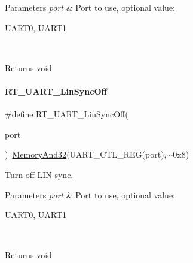 \begin{DoxyParams}{Parameters}
{\em port} & Port to use, optional value\+:
\begin{DoxyCode}
\mbox{\hyperlink{a00098_a0508661f121639ffdee7de2353a0def2}{UART0}}, \mbox{\hyperlink{a00098_a8d69bf04d07af4fbbab5a8bd291f65ff}{UART1}}
\end{DoxyCode}
 \\
\hline
\end{DoxyParams}
\begin{DoxyReturn}{Returns}
void 
\end{DoxyReturn}
\mbox{\label{a00098_aea01869278bc3c4e332af854c4e660be}} 
\paragraph{\texorpdfstring{R\+T\+\_\+\+U\+A\+R\+T\+\_\+\+Lin\+Sync\+Off}{RT\_UART\_LinSyncOff}}
{\footnotesize\ttfamily \#define R\+T\+\_\+\+U\+A\+R\+T\+\_\+\+Lin\+Sync\+Off(\begin{DoxyParamCaption}\item[{}]{port }\end{DoxyParamCaption})~\mbox{\hyperlink{a00026_ad87cedffcaadc51db22594fce55173d4}{Memory\+And32}}(U\+A\+R\+T\+\_\+\+C\+T\+L\+\_\+\+R\+EG(port),$\sim$0x8)}



Turn off L\+IN sync. 


\begin{DoxyParams}{Parameters}
{\em port} & Port to use, optional value\+:
\begin{DoxyCode}
\mbox{\hyperlink{a00098_a0508661f121639ffdee7de2353a0def2}{UART0}}, \mbox{\hyperlink{a00098_a8d69bf04d07af4fbbab5a8bd291f65ff}{UART1}}
\end{DoxyCode}
 \\
\hline
\end{DoxyParams}
\begin{DoxyReturn}{Returns}
void 
\end{DoxyReturn}
\mbox{\label{a00098_a49f9d43f5fd87ceed952123010e015fa}} 

